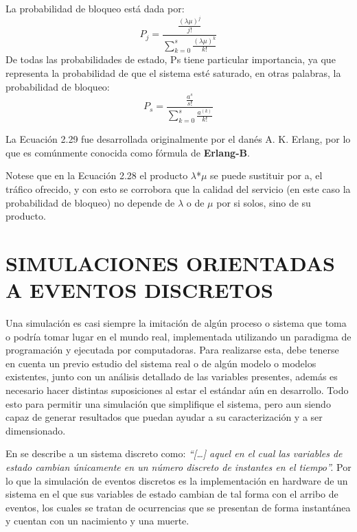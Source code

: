 La probabilidad de bloqueo está dada por:
\begin{equation}
    P_{j}=\frac{\frac{(\lambda\mu)^{j}}{j!}}{\sum_{k=0}^{s}\frac{(\lambda\mu)^{k}}{k!}}
    \label{eqn:Pb}
\end{equation} 
De todas las probabilidades de estado, Ps tiene particular importancia, ya que representa la probabilidad de que el sistema esté saturado, en otras palabras, la probabilidad de bloqueo:
\begin{equation}
    P_{s}=\frac{\frac{a^{s}}{s!}}{\sum_{k=0}^{s}\frac{a^(k)}{k!}}
    \label{eqn:Ps}
\end{equation} 

La Ecuación 2.29 fue desarrollada originalmente por el danés A. K. Erlang, por lo que es comúnmente conocida como fórmula de \textbf{Erlang-B}.\newline

Notese que en la Ecuación 2.28 el producto $\lambda$*$\mu$ se puede sustituir por a, el tráfico ofrecido, y con esto se corrobora que la calidad del servicio (en este caso la probabilidad de bloqueo) no depende de $\lambda$ o de $\mu$ por si solos, sino de su producto.\newline



\section{SIMULACIONES ORIENTADAS A EVENTOS DISCRETOS}


Una simulación es casi siempre la imitación de algún proceso o sistema que toma o podría tomar lugar en el mundo real, implementada utilizando un paradigma de programación y ejecutada por computadoras. Para realizarse esta, debe tenerse en cuenta un previo estudio del sistema real o de algún modelo o modelos existentes, junto con un análisis detallado de las variables presentes, además es necesario hacer distintas suposiciones al estar el estándar aún en desarrollo. Todo esto para permitir una simulación que simplifique el sistema, pero aun siendo capaz de generar resultados que puedan ayudar a su caracterización y a ser dimensionado. \newline

En \parencite{Banks2005} se describe a un sistema discreto como: \textit{``[{\dots}] aquel en el cual las variables de estado cambian únicamente en un número discreto de instantes en el tiempo''.} Por lo que la simulación de eventos discretos es la implementación en hardware de un sistema en el que sus variables de estado cambian de tal forma con el arribo de eventos, los cuales se tratan de ocurrencias que se presentan de forma instantánea y cuentan con un nacimiento y una muerte.\newline

